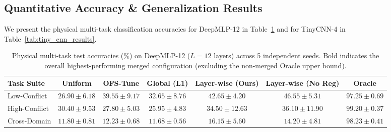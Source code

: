 \subsection{Quantitative Accuracy \& Generalization Results}

We present the physical multi-task classification accuracies for DeepMLP-12 in Table~\ref{tab:deep_mlp_results} and for TinyCNN-4 in Table~\ref{tab:tiny_cnn_results}.

\begin{table}[t]
\caption{Physical multi-task test accuracies (\%) on DeepMLP-12 ($L=12$ layers) across 5 independent seeds. Bold indicates the overall highest-performing merged configuration (excluding the non-merged Oracle upper bound).}
\label{tab:deep_mlp_results}
\vskip 0.04in
\begin{center}
\begin{small}
\begin{sc}
\setlength{\tabcolsep}{4pt}
\begin{tabular}{lcccccc}
\toprule
Task Suite & Uniform & OFS-Tune & Global (L1) & Layer-wise (Ours) & Layer-wise (No Reg) & Oracle \\
\midrule
Low-Conflict   & $26.90 \pm 6.18$ & $39.55 \pm 9.17$ & $32.65 \pm 8.76$ & $42.65 \pm 4.20$ & $\mathbf{46.55 \pm 5.31}$ & $97.25 \pm 0.69$ \\
High-Conflict  & $30.40 \pm 9.53$ & $27.80 \pm 5.03$ & $25.95 \pm 4.83$ & $34.50 \pm 12.63$ & $\mathbf{36.10 \pm 11.90}$ & $99.20 \pm 0.37$ \\
Cross-Domain   & $11.80 \pm 0.81$ & $12.23 \pm 0.68$ & $11.68 \pm 0.56$ & $\mathbf{16.15 \pm 5.60}$ & $14.20 \pm 4.81$ & $98.23 \pm 0.41$ \\
\bottomrule
\end{tabular}
\end{sc}
\end{small}
\end{center}
\vskip -0.18in
\end{table}


